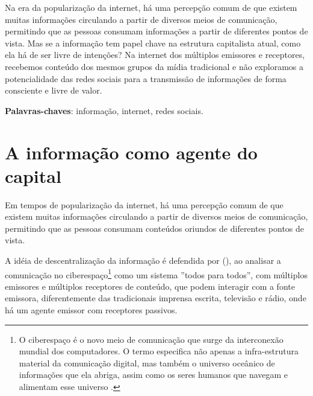 \documentclass[
	article,			%
	12pt,				%
	oneside,			%
	a4paper,			%
	english,			%
	brazil,				%
	]{abntex2}
\begin{document}
\frenchspacing 
\maketitle

\begin{resumoumacoluna}

Na era da popularização da internet, há uma percepção comum de que existem muitas informações circulando a partir de diversos meios de comunicação, permitindo que as pessoas consumam informações a partir de diferentes pontos de vista. Mas se a informação tem papel chave na estrutura capitalista atual, como ela há de ser livre de intenções? Na internet dos múltiplos emissores e receptores, recebemos conteúdo dos mesmos grupos da mídia tradicional e não exploramos a potencialidade das redes sociais para a transmissão de informações de forma consciente e livre de valor.
 
 \vspace{\onelineskip}
 
 \noindent
 \textbf{Palavras-chaves}: informação, internet, redes sociais.
\end{resumoumacoluna}

\textual

\section*{A informação como agente do capital}

Em tempos de popularização da internet, há uma percepção comum de que existem muitas informações circulando a partir de diversos meios de comunicação, permitindo que as pessoas consumam conteúdos oriundos de diferentes pontos de vista. 

A idéia de descentralização da informação é defendida por  (\citeyear{levy1998}), ao analisar a comunicação no ciberespaço\footnote{O ciberespaço é o novo meio de comunicação que surge da interconexão mundial dos computadores. O termo especifica não apenas a infra-estrutura material da comunicação digital, mas também o universo oceânico de informações que ela abriga, assim como os seres humanos que navegam e alimentam esse universo \cite[p. 17]{levy1999}.} como um sistema ''todos para todos'', com múltiplos emissores e múltiplos receptores de conteúdo, que podem interagir com a fonte emissora, diferentemente das tradicionais imprensa escrita, televisão e rádio, onde há um agente emissor com receptores passivos.
\end{document}
